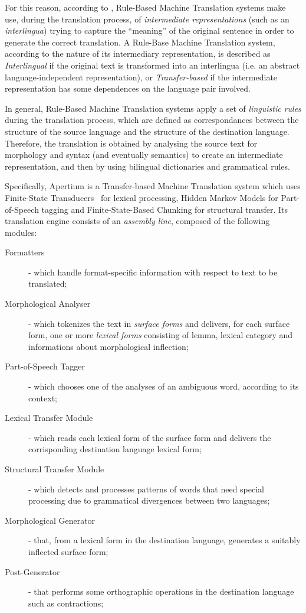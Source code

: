 \documentclass[11pt]{article}
\begin{document}
For this reason, according to \cite{arnoldea}, Rule-Based Machine Translation systems make use, during the translation process, of \emph{intermediate representations} (such as an \emph{interlingua}) trying to capture the ``meaning'' of the original sentence in order to generate the  correct translation. A Rule-Base Machine Translation system, according to the nature of its intermediary representation, is described as \emph{Interlingual} if the original text is transformed into an interlingua (i.e. an abstract language-independent representation), or \emph{Transfer-based} if the intermediate representation has some dependences on the language pair involved.

In general, Rule-Based Machine Translation systems apply a set of \emph{linguistic rules} during the translation process, which are defined as correspondances between the structure of the source language and the structure of the destination language. Therefore, the translation is obtained by analysing the source text for morphology and syntax (and eventually semantics) to create an intermediate representation, and then by using bilingual dictionaries and grammatical rules.

Specifically, Apertium is a Transfer-based Machine Translation system which uses Finite-State Transducers~\citep{fst} for lexical processing, Hidden Markov Models for Part-of-Speech tagging and Finite-State-Based Chunking for structural transfer. Its translation engine consists of an \emph{assembly line}, composed of the following modules:

\begin{description}
 \item[Formatters] - which handle format-specific information with respect to text to be translated;
 \item[Morphological Analyser] - which tokenizes the text in \emph{surface forms} and delivers, for each surface form, one or more \emph{lexical forms} consisting of lemma, lexical category and informations about morphological inflection;
 \item[Part-of-Speech Tagger] - which chooses one of the analyses of an ambiguous word, according to its context;
 \item[Lexical Transfer Module] - which reads each lexical form of the surface form and delivers the corrisponding destination language lexical form;
 \item[Structural Transfer Module] - which detects and processes patterns of words that need special processing due to grammatical divergences between two languages;
 \item[Morphological Generator] - that, from a lexical form in the destination language, generates a suitably inflected surface form;
 \item[Post-Generator] - that performs some orthographic operations in the destination language such as contractions;
\end{description}
\end{document}
